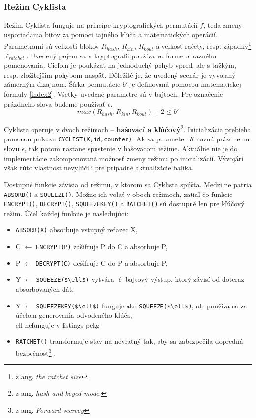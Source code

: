 \subsubsection{Režim Cyklista}\label{cyklista}
Režim Cyklista funguje na princípe kryptografických permutácií $f$, teda zmeny usporiadania bitov za pomoci tajného kľúča a matematických operácií. Parametrami sú veľkosti blokov $R_{hash}$, $R_{kin}$, $R_{kout}$ a veľkosť račety, resp. západky\footnote{z ang. \textit{the ratchet size}} \cite{ratchet} $\ell_{ratchet}$. Uvedený pojem sa v kryptografii používa vo forme obrazného pomenovania. Cieľom je poukázať na jednoduchý pohyb vpred, ale s ťažkým, resp. zložitejším pohybom naspäť. Dôležité je, že uvedený scenár je vyvolaný zámerným dizajnom. Šírka permutácie $b'$ je definovaná pomocou matematickej formuly \ref{index2}. Všetky uvedené parametre sú v bajtoch. Pre označenie prázdneho slova budeme používať $\epsilon$.
\begin{equation}\label{index2}
	max(R_{hash}, R_{kin}, R_{kout}) + 2 \leq b'
\end{equation} 

Cyklista operuje v dvoch režimoch -- \textbf{hašovací a kľúčový}\footnote{z ang. \textit{hash and keyed mode}.}. 
Inicializácia prebieha pomocou príkazu \lstinline|CYCLIST(K,id,counter)|. Ak sa parameter $K$ rovná prázdnemu slovu $\epsilon$, tak potom nastane spustenie v hašovacom režime. Aktuálne nie je do implementácie zakomponovaná možnosť zmeny režimu po inicializácií. Vývojári však túto vlastnosť nevylúčili pre prípadné aktualizácie balíka.  


Dostupné funkcie závisia od režimu, v ktorom sa  Cyklista spúšťa. Medzi ne patria \lstinline|ABSORB()| a \lstinline|SQUEEZE()|. Možno ich volať v oboch režimoch, zatiaľ čo funkcie \lstinline|ENCRYPT()|, \lstinline|DECRYPT()|, \lstinline|SQUEEZEKEY()| a \lstinline|RATCHET()| sú dostupné len pre kľúčový režim. Účel každej funkcie je nasledujúci:
\begin{itemize}
	\item \lstinline|ABSORB(X)| absorbuje vstupný reťazec X,
	\item C $\gets$ \lstinline|ENCRYPT(P)| zašifruje P do C a absorbuje P,
	\item P $\gets$ \lstinline|DECRYPT(C)| dešifruje C do P a absorbuje P,
	\item Y $\gets$	\lstinline|SQUEEZE($\ell$)|  vytvára $\ell$-bajtový výstup, ktorý závisí od doteraz absorbovaných dát,
	\item Y $\gets$	\lstinline|SQUEEZEKEY($\ell$)| funguje ako \lstinline|SQUEEZE($\ell$)|, ale používa sa za účelom generovania odvodeného kľúča, 		\\ell nefunguje v listings pckg
	\item \lstinline|RATCHET()| transformuje stav na nevratný tak, aby sa zabezpečila dopredná bezpečnosť\footnote{z ang. \textit{Forward secrecy}} \cite{fsec}. 
\end{itemize}


